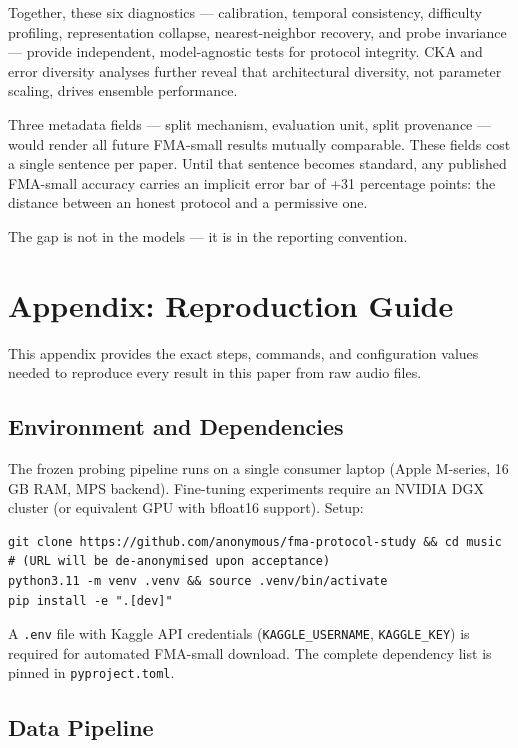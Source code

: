 \documentclass[conference]{IEEEtran}
\begin{document}
Together, these six diagnostics --- calibration, temporal
consistency, difficulty profiling, representation collapse,
nearest-neighbor recovery, and probe invariance --- provide
independent, model-agnostic tests for protocol integrity. CKA and error
diversity analyses further reveal that architectural diversity, not
parameter scaling, drives ensemble performance.

Three metadata fields --- split mechanism, evaluation unit, split
provenance --- would render all future FMA-small results mutually
comparable. These fields cost a single sentence per paper. Until that
sentence becomes standard, any published FMA-small accuracy carries an
implicit error bar of +31 percentage points: the distance between an
honest protocol and a permissive one.

The gap is not in the models --- it is in the reporting convention.

\section{Appendix: Reproduction
Guide}\label{appendix-reproduction-guide}

This appendix provides the exact steps, commands, and configuration
values needed to reproduce every result in this paper from raw audio
files.

\subsection{Environment and
Dependencies}\label{a.-environment-and-dependencies}

The frozen probing pipeline runs on a single consumer laptop (Apple
M-series, 16 GB RAM, MPS backend). Fine-tuning experiments require an
NVIDIA DGX cluster (or equivalent GPU with bfloat16 support). Setup:

\begin{verbatim}
git clone https://github.com/anonymous/fma-protocol-study && cd music
# (URL will be de-anonymised upon acceptance)
python3.11 -m venv .venv && source .venv/bin/activate
pip install -e ".[dev]"
\end{verbatim}

A \texttt{.env} file with Kaggle API credentials
(\texttt{KAGGLE\_USERNAME}, \texttt{KAGGLE\_KEY}) is required for
automated FMA-small download. The complete dependency list is pinned in
\texttt{pyproject.toml}.

\subsection{Data Pipeline}\label{b.-data-pipeline}
\end{document}
